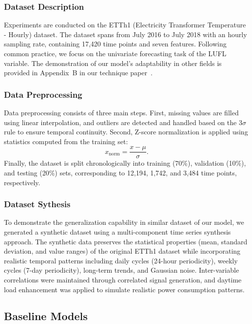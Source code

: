 \subsubsection{Dataset Description}
Experiments are conducted on the ETTh1 (Electricity Transformer Temperature - Hourly) dataset. The dataset spans from July 2016 to July 2018 with an hourly sampling rate, containing 17,420 time points and seven features. Following common practice, we focus on the univariate forecasting task of the LUFL variable. 
The demonstration of our model's adaptability in other fields is provided in Appendix~B in our technique paper~\cite{Xu2026MRImaginTime}.

\subsubsection{Data Preprocessing}
Data preprocessing consists of three main steps. First, missing values are filled using linear interpolation, and outliers are detected and handled based on the $3\sigma$ rule to ensure temporal continuity. Second, Z-score normalization is applied using statistics computed from the training set:
\[x_{\text{norm}} = \frac{x - \mu}{\sigma}.\]
Finally, the dataset is split chronologically into training (70\%), validation (10\%), and testing (20\%) sets, corresponding to 12,194, 1,742, and 3,484 time points, respectively.

\subsubsection{Dataset Sythesis}
To demonstrate the generalization capability in similar dataset of our model, we generated a synthetic dataset using a multi-component time series synthesis approach. The synthetic data preserves the statistical properties (mean, standard deviation, and value ranges) of the original ETTh1 dataset while incorporating realistic temporal patterns including daily cycles (24-hour periodicity), weekly cycles (7-day periodicity), long-term trends, and Gaussian noise. Inter-variable correlations were maintained through correlated signal generation, and daytime load enhancement was applied to simulate realistic power consumption patterns. 


\subsection{Baseline Models}

